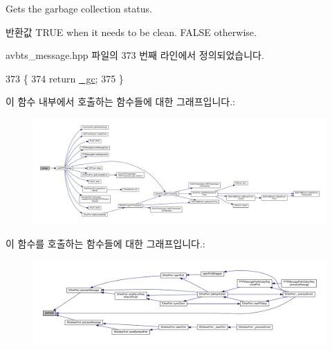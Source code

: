 Gets the garbage collection status. 

\begin{DoxyReturn}{반환값}
T\+R\+UE when it needs to be clean. F\+A\+L\+SE otherwise. 
\end{DoxyReturn}


avbts\+\_\+message.\+hpp 파일의 373 번째 라인에서 정의되었습니다.


\begin{DoxyCode}
373                    \{
374         \textcolor{keywordflow}{return} \hyperlink{class_p_t_p_message_common_a1b15d1687680708819ead19f82a970a9}{\_gc};
375     \}
\end{DoxyCode}


이 함수 내부에서 호출하는 함수들에 대한 그래프입니다.\+:
\nopagebreak
\begin{figure}[H]
\begin{center}
\leavevmode
\includegraphics[width=350pt]{class_p_t_p_message_common_a1a2b4b1eeb289619b14affa39f8284f7_cgraph}
\end{center}
\end{figure}




이 함수를 호출하는 함수들에 대한 그래프입니다.\+:
\nopagebreak
\begin{figure}[H]
\begin{center}
\leavevmode
\includegraphics[width=350pt]{class_p_t_p_message_common_a1a2b4b1eeb289619b14affa39f8284f7_icgraph}
\end{center}
\end{figure}


